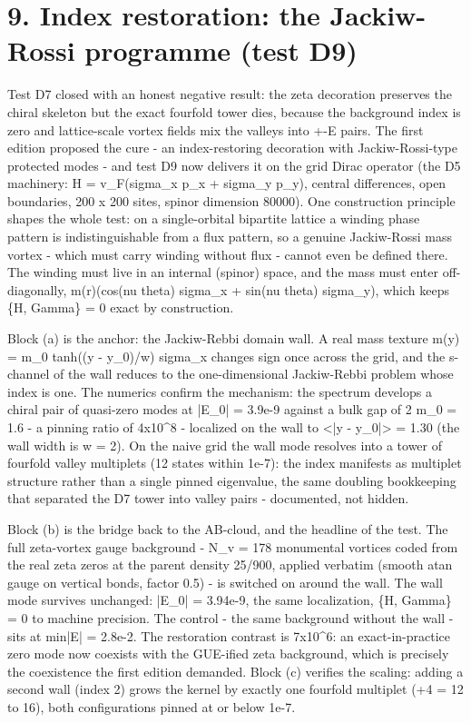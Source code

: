 \documentclass[11pt,a4paper]{article}
\begin{document}
\section{9. Index restoration: the Jackiw-Rossi programme (test D9)}
Test D7 closed with an honest negative result: the zeta decoration preserves the chiral skeleton but the exact fourfold tower dies, because the background index is zero and lattice-scale vortex fields mix the valleys into +-E pairs. The first edition proposed the cure - an index-restoring decoration with Jackiw-Rossi-type protected modes - and test D9 now delivers it on the grid Dirac operator (the D5 machinery: H = v\_\allowbreak{}F(sigma\_\allowbreak{}x p\_\allowbreak{}x + sigma\_\allowbreak{}y p\_\allowbreak{}y), central differences, open boundaries, 200 x 200 sites, spinor dimension 80000). One construction principle shapes the whole test: on a single-orbital bipartite lattice a winding phase pattern is indistinguishable from a flux pattern, so a genuine Jackiw-Rossi mass vortex - which must carry winding without flux - cannot even be defined there. The winding must live in an internal (spinor) space, and the mass must enter off-diagonally, m(r)(cos(nu theta) sigma\_\allowbreak{}x + sin(nu theta) sigma\_\allowbreak{}y), which keeps \{H, Gamma\} = 0 exact by construction.

Block (a) is the anchor: the Jackiw-Rebbi domain wall. A real mass texture m(y) = m\_\allowbreak{}0 tanh((y - y\_\allowbreak{}0)/w) sigma\_\allowbreak{}x changes sign once across the grid, and the s-channel of the wall reduces to the one-dimensional Jackiw-Rebbi problem whose index is one. The numerics confirm the mechanism: the spectrum develops a chiral pair of quasi-zero modes at |E\_\allowbreak{}0| = 3.9e-9 against a bulk gap of 2 m\_\allowbreak{}0 = 1.6 - a pinning ratio of 4x10\^{}8 - localized on the wall to <|y - y\_\allowbreak{}0|> = 1.30 (the wall width is w = 2). On the naive grid the wall mode resolves into a tower of fourfold valley multiplets (12 states within 1e-7): the index manifests as multiplet structure rather than a single pinned eigenvalue, the same doubling bookkeeping that separated the D7 tower into valley pairs - documented, not hidden.

Block (b) is the bridge back to the AB-cloud, and the headline of the test. The full zeta-vortex gauge background - N\_\allowbreak{}v = 178 monumental vortices coded from the real zeta zeros at the parent density 25/900, applied verbatim (smooth atan gauge on vertical bonds, factor 0.5) - is switched on around the wall. The wall mode survives unchanged: |E\_\allowbreak{}0| = 3.94e-9, the same localization, \{H, Gamma\} = 0 to machine precision. The control - the same background without the wall - sits at min|E| = 2.8e-2. The restoration contrast is 7x10\^{}6: an exact-in-practice zero mode now coexists with the GUE-ified zeta background, which is precisely the coexistence the first edition demanded. Block (c) verifies the scaling: adding a second wall (index 2) grows the kernel by exactly one fourfold multiplet (+4 = 12 to 16), both configurations pinned at or below 1e-7.
\end{document}
